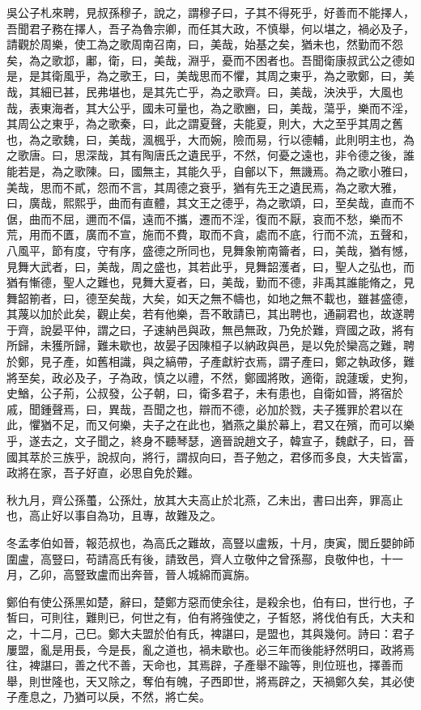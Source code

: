 \begin{pinyinscope}
吳公子札來聘，見叔孫穆子，說之，謂穆子曰，子其不得死乎，好善而不能擇人，吾聞君子務在擇人，吾子為魯宗卿，而任其大政，不慎舉，何以堪之，禍必及子，請觀於周樂，使工為之歌周南召南，曰，美哉，始基之矣，猶未也，然勤而不怨矣，為之歌邶，鄘，衛，曰，美哉，淵乎，憂而不困者也。吾聞衛康叔武公之德如是，是其衛風乎，為之歌王，曰，美哉思而不懼，其周之東乎，為之歌鄭，曰，美哉，其細已甚，民弗堪也，是其先亡乎，為之歌齊。曰，美哉，泱泱乎，大風也哉，表東海者，其大公乎，國未可量也，為之歌豳，曰，美哉，蕩乎，樂而不淫，其周公之東乎，為之歌秦，曰，此之謂夏聲，夫能夏，則大，大之至乎其周之舊也，為之歌魏，曰，美哉，渢楓乎，大而婉，險而易，行以德輔，此則明主也，為之歌唐。曰，思深哉，其有陶唐氏之遺民乎，不然，何憂之遠也，非令德之後，誰能若是，為之歌陳。曰，國無主，其能久乎，自鄶以下，無譏焉。為之歌小雅曰，美哉，思而不貳，怨而不言，其周德之衰乎，猶有先王之遺民焉，為之歌大雅，曰，廣哉，熙熙乎，曲而有直體，其文王之德乎，為之歌頌，曰，至矣哉，直而不倨，曲而不屈，邇而不偪，遠而不攜，遷而不淫，復而不厭，哀而不愁，樂而不荒，用而不匱，廣而不宣，施而不費，取而不貪，處而不底，行而不流，五聲和，八風平，節有度，守有序，盛德之所同也，見舞象箾南籥者，曰，美哉，猶有憾，見舞大武者，曰，美哉，周之盛也，其若此乎，見舞韶濩者，曰，聖人之弘也，而猶有慚德，聖人之難也，見舞大夏者，曰，美哉，勤而不德，非禹其誰能脩之，見舞韶箾者，曰，德至矣哉，大矣，如天之無不幬也，如地之無不載也，雖甚盛德，其蔑以加於此矣，觀止矣，若有他樂，吾不敢請已，其出聘也，通嗣君也，故遂聘于齊，說晏平仲，謂之曰，子速納邑與政，無邑無政，乃免於難，齊國之政，將有所歸，未獲所歸，難未歇也，故晏子因陳桓子以納政與邑，是以免於欒高之難，聘於鄭，見子產，如舊相識，與之縞帶，子產獻紵衣焉，謂子產曰，鄭之執政侈，難將至矣，政必及子，子為政，慎之以禮，不然，鄭國將敗，適衛，說蘧瑗，史狗，史鰌，公子荊，公叔發，公子朝，曰，衛多君子，未有患也，自衛如晉，將宿於戚，聞鍾聲焉，曰，異哉，吾聞之也，辯而不德，必加於戮，夫子獲罪於君以在此，懼猶不足，而又何樂，夫子之在此也，猶燕之巢於幕上，君又在殯，而可以樂乎，遂去之，文子聞之，終身不聽琴瑟，適晉說趙文子，韓宣子，魏獻子，曰，晉國其萃於三族乎，說叔向，將行，謂叔向曰，吾子勉之，君侈而多良，大夫皆富，政將在家，吾子好直，必思自免於難。

秋九月，齊公孫蠆，公孫灶，放其大夫高止於北燕，乙未出，書曰出奔，罪高止也，高止好以事自為功，且專，故難及之。

冬孟孝伯如晉，報范叔也，為高氏之難故，高豎以盧叛，十月，庚寅，閭丘嬰帥師圍盧，高豎曰，苟請高氏有後，請致邑，齊人立敬仲之曾孫酀，良敬仲也，十一月，乙卯，高豎致盧而出奔晉，晉人城綿而寘旃。

鄭伯有使公孫黑如楚，辭曰，楚鄭方惡而使余往，是殺余也，伯有曰，世行也，子皙曰，可則往，難則已，何世之有，伯有將強使之，子皙怒，將伐伯有氏，大夫和之，十二月，己巳。鄭大夫盟於伯有氏，裨諶曰，是盟也，其與幾何。詩曰：君子屢盟，亂是用長，今是長，亂之道也，禍未歇也。必三年而後能紓然明曰，政將焉往，裨諶曰，善之代不善，天命也，其焉辟，子產舉不踰等，則位班也，擇善而舉，則世隆也，天又除之，奪伯有魄，子西即世，將焉辟之，天禍鄭久矣，其必使子產息之，乃猶可以戾，不然，將亡矣。


\end{pinyinscope}
